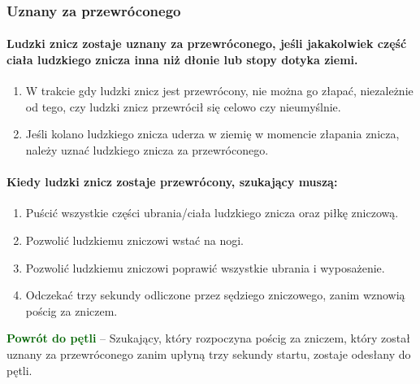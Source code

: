 \documentclass[12pt]{article}
\newcommand\other[1]{\bgroup\textcolor{darkgreen}{\textbf{#1}}}
\begin{document}
\subsubsection{Uznany za przewróconego}

\paragraph{Ludzki znicz zostaje uznany za przewróconego, jeśli
	jakakolwiek część ciała ludzkiego znicza inna niż dłonie lub stopy
	dotyka ziemi.}

\begin{enumerate}
	\item W trakcie gdy ludzki znicz jest przewrócony, nie można go złapać,
	      niezależnie od tego, czy ludzki znicz przewrócił się celowo czy
	      nieumyślnie.

	\item Jeśli kolano ludzkiego znicza uderza w ziemię w momencie złapania
	      znicza, należy uznać ludzkiego znicza za przewróconego.
\end{enumerate}

\paragraph{Kiedy ludzki znicz zostaje przewrócony, szukający
	muszą:}

\begin{enumerate}
	\item Puścić wszystkie części ubrania/ciała ludzkiego znicza oraz piłkę
	      zniczową.

	\item Pozwolić ludzkiemu zniczowi wstać na nogi.

	\item Pozwolić ludzkiemu zniczowi poprawić wszystkie ubrania i wyposażenie.

	\item Odczekać trzy sekundy odliczone przez sędziego zniczowego, zanim
	      wznowią pościg za zniczem.
\end{enumerate}

\other{Powrót do pętli} -- Szukający, który rozpoczyna pościg za zniczem,
który został uznany za przewróconego zanim upłyną trzy sekundy startu,
zostaje odesłany do pętli.
\end{document}
